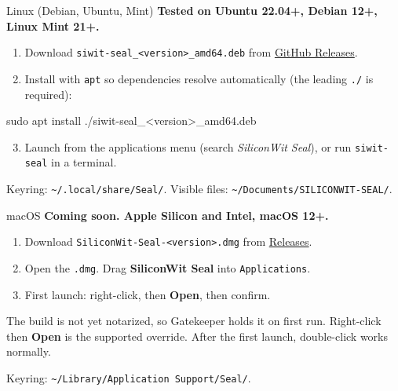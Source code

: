 \documentclass[aspectratio=169,11pt]{beamer}
\newcommand{\releasesurl}{https://github.com/SiliconWit/siwit-seal-releases/releases}
\begin{document}
\begin{frame}{Linux (Debian, Ubuntu, Mint)}
  \textbf{Tested on Ubuntu 22.04+, Debian 12+, Linux Mint 21+.}
  \begin{enumerate}
    \item Download \texttt{siwit-seal\_<version>\_amd64.deb} from \href{\releasesurl}{GitHub Releases}.
    \item Install with \texttt{apt} so dependencies resolve automatically (the leading \texttt{./} is required):
  \end{enumerate}
  \begin{cmdbox}
sudo apt install ./siwit-seal\_<version>\_amd64.deb
  \end{cmdbox}
  \begin{enumerate}
    \setcounter{enumi}{2}
    \item Launch from the applications menu (search \emph{SiliconWit Seal}), or run \texttt{siwit-seal} in a terminal.
  \end{enumerate}
  \vspace{0.4em}
  \small\textcolor{swMute}{Keyring: \texttt{\textasciitilde/.local/share/Seal/}. Visible files: \texttt{\textasciitilde/Documents/SILICONWIT-SEAL/}.}
\end{frame}

\begin{frame}{macOS}
  \textbf{Coming soon. Apple Silicon and Intel, macOS 12+.}
  \begin{enumerate}
    \item Download \texttt{SiliconWit-Seal-<version>.dmg} from \href{\releasesurl}{Releases}.
    \item Open the \texttt{.dmg}. Drag \textbf{SiliconWit Seal} into \texttt{Applications}.
    \item First launch: right-click, then \textbf{Open}, then confirm.
  \end{enumerate}
  \vspace{0.4em}
  \begin{notebox}
    The build is not yet notarized, so Gatekeeper holds it on first run.
    Right-click then \textbf{Open} is the supported override. After the
    first launch, double-click works normally.
  \end{notebox}
  \vspace{0.2em}
  \small\textcolor{swMute}{Keyring: \texttt{\textasciitilde/Library/Application Support/Seal/}.}
\end{frame}
\end{document}
